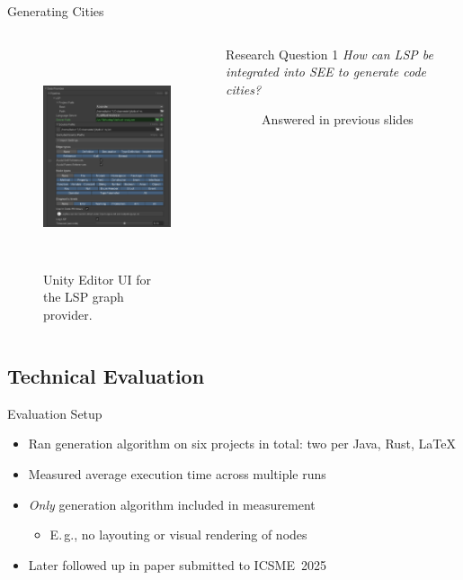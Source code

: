\documentclass[xcolor={dvipsnames},aspectratio=169,compress]{beamer} %
\newcommand{\follows}{\raisebox{-0.7mm}{\scalebox{1.4}{\textcolor{Maroon}{\ding{43}}}}}
\newcommand{\answer}[1]{\begin{description}\item[\follows{}]{#1}\end{description}}
\begin{document}
\begin{frame}{Generating Cities}
	\begin{columns}
		\begin{figure}
			\begin{center}
				\includegraphics[height=6.5cm]{figures/unity_lsp_provider}
			\end{center}
			\caption{Unity Editor UI for the LSP graph provider.}
		\end{figure}

		\begin{alertblock}{Research Question 1}
			\emph{How can LSP be integrated into SEE to generate code cities?}
			\answer{\small Answered in previous slides}
		\end{alertblock}
	\end{columns}

\end{frame}

\subsection{Technical Evaluation}

\begin{frame}{Evaluation Setup}
	\begin{itemize}
		\item Ran generation algorithm on six projects in total: two per Java, Rust, \LaTeX{}
		\item Measured average execution time across multiple runs
		\item \emph{Only} generation algorithm included in measurement
		      \begin{itemize}
			      \item E.\,g., no layouting or visual rendering of nodes
		      \end{itemize}
		\item Later followed up in paper submitted to ICSME~2025
	\end{itemize}
\end{frame}
\end{document}
